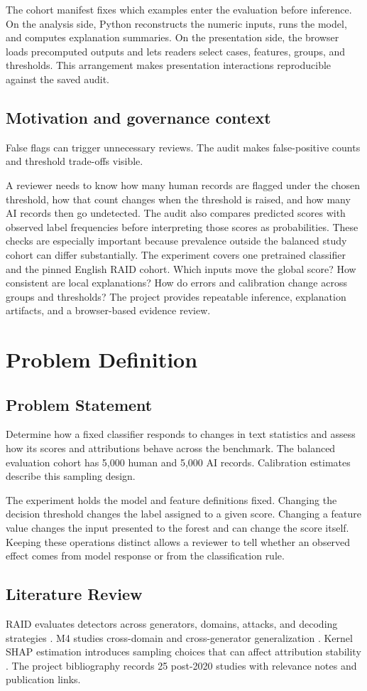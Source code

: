 \documentclass[12pt,oneside]{report}
\begin{document}
The cohort manifest fixes which examples enter the evaluation before inference. On the analysis side, Python reconstructs the numeric inputs, runs the model, and computes explanation summaries. On the presentation side, the browser loads precomputed outputs and lets readers select cases, features, groups, and thresholds. This arrangement makes presentation interactions reproducible against the saved audit.
\section{Motivation and governance context}
False flags can trigger unnecessary reviews. The audit makes false-positive counts and threshold trade-offs visible.

A reviewer needs to know how many human records are flagged under the chosen threshold, how that count changes when the threshold is raised, and how many AI records then go undetected. The audit also compares predicted scores with observed label frequencies before interpreting those scores as probabilities. These checks are especially important because prevalence outside the balanced study cohort can differ substantially.
The experiment covers one pretrained classifier and the pinned English RAID cohort.
Which inputs move the global score? How consistent are local explanations? How do errors and calibration change across groups and thresholds?
The project provides repeatable inference, explanation artifacts, and a browser-based evidence review.
\chapter{Problem Definition}
\section{Problem Statement}
Determine how a fixed classifier responds to changes in text statistics and assess how its scores and attributions behave across the benchmark. The balanced evaluation cohort has 5,000 human and 5,000 AI records. Calibration estimates describe this sampling design.

The experiment holds the model and feature definitions fixed. Changing the decision threshold changes the label assigned to a given score. Changing a feature value changes the input presented to the forest and can change the score itself. Keeping these operations distinct allows a reviewer to tell whether an observed effect comes from model response or from the classification rule.
\section{Literature Review}
RAID evaluates detectors across generators, domains, attacks, and decoding strategies \cite{raid}. M4 studies cross-domain and cross-generator generalization \cite{m4}. Kernel SHAP estimation introduces sampling choices that can affect attribution stability \cite{kernel}. The project bibliography records 25 post-2020 studies with relevance notes and publication links.
\end{document}
